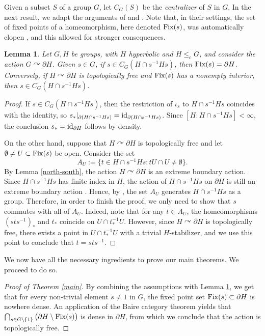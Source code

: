 \documentclass[11pt]{article}
\newtheorem{lem}[thm]{Lemma}
\theoremstyle{definition}
\theoremstyle{remark}
\numberwithin{equation}{section}
\numberwithin{equation}{section}
\numberwithin{equation}{section}
\begin{document}
Given a subset $S$ of a group $G$, let $C_G(S)$ be the \emph{centralizer} of $S$ in $G$. In the next result, we adapt the arguments of \cite[Lemma 3.3]{LiSc23} and \cite[Lemma 5.3]{BKKO17}. Note that, in their settings, the set of fixed points of a homeomorphism, here denoted ${\rm Fix}(s)$, was automatically clopen \cite{BKKO17}, and this allowed for stronger consequences.

\begin{lem}\label{interior}
Let $G,H$ be groups, with $H$ hyperbolic and $H\leq_cG$, and consider the action $ G\curvearrowright\partial H$. Given $s\in G$, if $s\in C_G( H \cap s^{-1}Hs)$, then ${\rm Fix}(s)=\partial H$.  Conversely, if $ H \curvearrowright\partial H$ is topologically free and ${\rm Fix}(s)$ has a nonempty interior, then $s\in C_G( H \cap s^{-1}Hs)$.
\end{lem}
\begin{proof}
 If $s\in C_G(H\cap s^{-1}Hs)$, then the restriction of $\iota_s$ to $H \cap s^{-1}Hs$ coincides with the identity, so $s_*|_{\partial (H \cap s^{-1}Hs)}={\rm id}_{\partial(H \cap s^{-1}Hs)}$. Since $[H:H \cap s^{-1}Hs]<\infty$, the conclusion $s_*={\rm id}_{\partial H}$ follows by density.
 

On the other hand, suppose that $H \curvearrowright\partial H$ is topologically free and let $\emptyset\not=U\subset{\rm Fix}(s)$ be open. Consider the set 
$$
A_U:=\{t\in H \cap s^{-1}Hs:tU\cap U\neq\emptyset\}.
$$
By Lemma \ref{north-south}, the action $H\curvearrowright\partial H$ is an extreme boundary action. Since $H \cap s^{-1}Hs$ has finite index in $H$, the action of $H \cap s^{-1}Hs$ on $\partial H$ is still an extreme boundary action \cite[Proposition 1.3]{FKOCP26}. Hence, by \cite[Lemma 5.1]{BKKO17}, the set $A_U$ generates $H \cap s^{-1}Hs$ as a group. Therefore, in order to finish the proof, we only need to show that $s$ commutes with all of $A_U$. Indeed, note that for any $t\in A_U$, the homeomorphisms $(sts^{-1})_*$ and $t_*$ coincide on $U\cap t^{-1}_*U$. However, since $H \curvearrowright\partial H$ is topologically free, there exists a point in $U\cap t^{-1}_*U$ with a trivial $H$-stabilizer, and we use this point to conclude that $t=sts^{-1}$.
\end{proof}

We now have all the necessary ingredients to prove our main theorems. We proceed to do so.

\begin{proof}[Proof of Theorem \ref{main}]
    By combining the assumptions with Lemma \ref{interior}, we get that for every non-trivial element $s\not=1$ in $G$, the fixed point set ${\rm Fix}(s)\subset \partial H$ is nowhere dense. An application of the Baire category theorem yields that $\bigcap_{s\in G\setminus\{1\}}\big(\partial H\setminus{\rm Fix}(s)\big)$ is dense in $\partial H$, from which we conclude that the action is topologically free. 
\end{proof}
\end{document}
